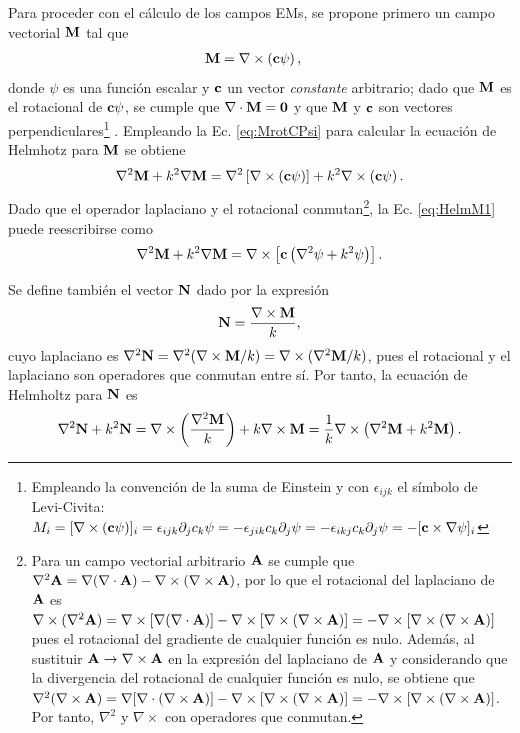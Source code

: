 \noindent	
Para proceder con el cálculo de los campos EMs, se propone primero un campo vectorial $\vb{M}$ tal que
	\begin{align}
	\vb{M} &= \nabla \times \left(\vb{c} \psi\right),
	\label{eq:MrotCPsi}
	\end{align}
donde $\psi$ es una función escalar y $\vb{c}$ un vector \emph{constante} arbitrario; dado que $\vb{M}$ es el rotacional de  $\vb{c}\psi$, se cumple que $\nabla\cdot \vb{M} = \vb{0}$ y que $\vb{M}$ y $\vb{c}$ son vectores perpendiculares\footnote{Empleando la convención de la suma de Einstein y con $\epsilon_{ijk}$ el símbolo de  Levi-Civita: $M_i = [\nabla\times(\vb{c}\psi)]_i =  \epsilon_{ijk}\partial_jc_k\psi = -\epsilon_{jik}c_k\partial_j\psi = -\epsilon_{ikj}c_k\partial_j\psi  = - [\vb{c}\times\nabla\psi]_i$} . Empleando la Ec. \eqref{eq:MrotCPsi} para calcular la ecuación de Helmhotz para $\vb{M}$ se obtiene
	\begin{equation}
	\nabla^2 \vb{M} + k^2 \nabla\vb{M} = \nabla^2 \left[ \nabla\times\left(\vb{c} \psi\right) \right]+ 
			k^2 \nabla \times \left(\vb{c} \psi\right).\label{eq:HelmM1}
	\end{equation}
Dado que el operador laplaciano y el rotacional conmutan\footnote{ Para un campo vectorial arbitrario $\vb{A}$ se cumple que $\nabla^2\vb{A} = \nabla(\nabla\cdot\vb{A}) - \nabla\times(\nabla\times\vb{A})$, por lo que el rotacional del laplaciano de $\vb{A}$ es $ \nabla\times( \nabla^2\vb{A})=\nabla\times[\nabla(\nabla\cdot\vb{A})  ]-  \nabla\times[\nabla\times(\nabla\times \vb{A})] = -  \nabla\times[\nabla\times(\nabla\times \vb{A})] $ pues el rotacional del gradiente de cualquier función es nulo. Además, al sustituir $\vb{A}\to \nabla\times\vb{A}$ en la expresión del laplaciano de $\vb{A}$ y  considerando que la divergencia del rotacional de cualquier función es nulo, se obtiene que$ \nabla^2(\nabla\times\vb{A})=\nabla[\nabla\cdot(\nabla\times\vb{A})  ]-  \nabla\times[\nabla\times(\nabla\times \vb{A})] = -  \nabla\times[\nabla\times(\nabla\times \vb{A})] $. Por tanto, $\nabla^2$ y $\nabla\times$ con operadores que conmutan.}, la Ec. \eqref{eq:HelmM1} puede reescribirse como
	\begin{equation}
	\nabla^2 \vb{M} + k^2 \nabla\vb{M}  = \nabla\times\left[\vb{c}\left( \nabla^2\psi+k^2\psi \right) \right].
	\end{equation}
	
Se define también el vector $\vb{N}$ dado por la expresión
	\begin{equation}
	\vb{N} = \frac{\nabla\times \vb{M}}{k}, \label{eq:NrotM/k}
	\end{equation}
cuyo laplaciano es $\nabla^2 \vb{N} = \nabla^2( \nabla\times \vb{M} /k) =  \nabla\times (\nabla^2\vb{M} /k) $, pues el rotacional y el laplaciano son operadores que conmutan entre sí. Por tanto, la ecuación de Helmholtz para $\vb{N}$ es
	\begin{align}
	\nabla^2 \vb{N} + k^2 \vb{N} =  \nabla\times \left( \frac{\nabla^2 \vb{M}}{k} \right) + k \nabla\times \vb{M} 
		 = \frac{1}{k} \nabla\times \left( \nabla^2 \vb{M} + k^2  \vb{M} \right).
	\end{align}


